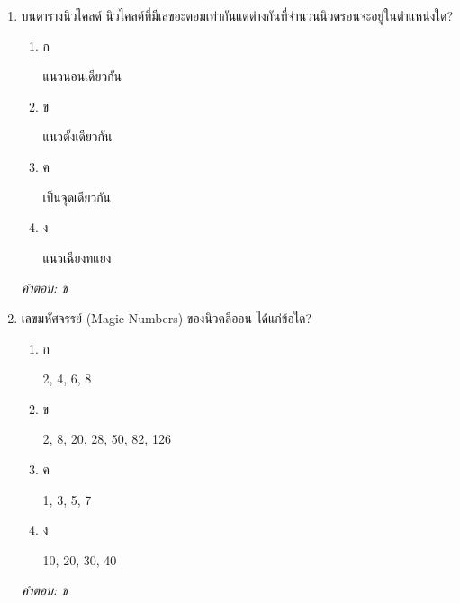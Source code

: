 \documentclass[12pt]{article}
\begin{document}
\begin{enumerate}[label=\arabic*., itemsep=0.5\baselineskip, topsep=0.5\baselineskip, leftmargin=*]
\item บนตารางนิวไคลด์ นิวไคลด์ที่มีเลขอะตอมเท่ากันแต่ต่างกันที่จำนวนนิวตรอนจะอยู่ในตำแหน่งใด?
\begin{enumerate}[label=\alph*)., itemsep=0.3\baselineskip, topsep=0.3\baselineskip]
\item ก\ 
\begin{minipage}[t]{0.9\linewidth}
\raggedright แนวนอนเดียวกัน
\end{minipage}
\item ข\ 
\begin{minipage}[t]{0.9\linewidth}
\raggedright แนวตั้งเดียวกัน
\end{minipage}
\item ค\ 
\begin{minipage}[t]{0.9\linewidth}
\raggedright เป็นจุดเดียวกัน
\end{minipage}
\item ง\ 
\begin{minipage}[t]{0.9\linewidth}
\raggedright แนวเฉียงทแยง
\end{minipage}
\end{enumerate}
\vspace{-0.3\baselineskip}
\begin{small}
\textit{คำตอบ: ข}
\end{small}

\item เลขมหัศจรรย์ (Magic Numbers) ของนิวคลีออน ได้แก่ข้อใด?
\begin{enumerate}[label=\alph*)., itemsep=0.3\baselineskip, topsep=0.3\baselineskip]
\item ก\ 
\begin{minipage}[t]{0.9\linewidth}
\raggedright 2, 4, 6, 8
\end{minipage}
\item ข\ 
\begin{minipage}[t]{0.9\linewidth}
\raggedright 2, 8, 20, 28, 50, 82, 126
\end{minipage}
\item ค\ 
\begin{minipage}[t]{0.9\linewidth}
\raggedright 1, 3, 5, 7
\end{minipage}
\item ง\ 
\begin{minipage}[t]{0.9\linewidth}
\raggedright 10, 20, 30, 40
\end{minipage}
\end{enumerate}
\vspace{-0.3\baselineskip}
\begin{small}
\textit{คำตอบ: ข}
\end{small}


\end{enumerate}
\end{document}
